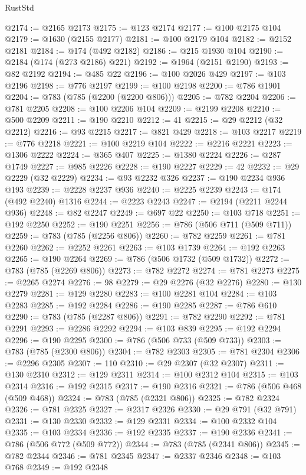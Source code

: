 \begin{lexlean}{RustStd}
\begin{coremodule}
{\begin{coremodule}
{{{{{{{{{{{{{{{{{{{{{{{{{{{{{{{{{{{{{{{{{{{{{{{{{{{{{{{@2174 := @2165 @2173
@2175 := @123 @2174
@2177 := @100 @2175 @104
@2179 := @1630 (@2155 @2177)
@2181 := @100 @2179 @104
@2182 := @2152 @2181
@2184 := @174 (@492 @2182)
@2186 := @215 @1930 @104
@2190 := @2184 (@174 (@273 @2186) @221)
@2192 := @1964 (@2151 @2190)
@2193 := @82 @2192
@2194 := @485 @22
@2196 := @100 @2026 @429
@2197 := @103 @2196
@2198 := @776 @2197
@2199 := @100 @2198
@2200 := @786 @1901
@2204 := @783 (@785 (@2200 (@2200 @806)))
@2205 := @782 @2204
@2206 := @781 @2205
@2208 := @100 @2206 @104
@2209 := @2199 @2208
@2210 := @500 @2209
@2211 := @190 @2210
@2212 := 41
@2215 := @29 @2212 (@32 @2212)
@2216 := @93 @2215
@2217 := @821 @429
@2218 := @103 @2217
@2219 := @776 @2218
@2221 := @100 @2219 @104
@2222 := @2216 @2221
@2223 := @1306 @2222
@2224 := @365 @407
@2225 := @1380 @2224
@2226 := @287 @1749
@2227 := @985 @2226
@2228 := @190 @2227
@2229 := 42
@2232 := @29 @2229 (@32 @2229)
@2234 := @93 @2232 @326
@2237 := @190 @2234 @936 @193
@2239 := @2228 @2237 @936
@2240 := @2225 @2239
@2243 := @174 (@492 @2240) @1316
@2244 := @2223 @2243
@2247 := @2194 (@2211 @2244 @936)
@2248 := @82 @2247
@2249 := @697 @22
@2250 := @103 @718
@2251 := @192 @2250
@2252 := @190 @2251
@2256 := @786 (@506 @711 (@509 @711))
@2259 := @783 (@785 (@2256 @806))
@2260 := @782 @2259
@2261 := @781 @2260
@2262 := @2252 @2261
@2263 := @103 @1739
@2264 := @192 @2263
@2265 := @190 @2264
@2269 := @786 (@506 @1732 (@509 @1732))
@2272 := @783 (@785 (@2269 @806))
@2273 := @782 @2272
@2274 := @781 @2273
@2275 := @2265 @2274
@2276 := 98
@2279 := @29 @2276 (@32 @2276)
@2280 := @130 @2279
@2281 := @129 @2280
@2283 := @100 @2281 @104
@2284 := @103 @2283
@2285 := @192 @2284
@2286 := @190 @2285
@2287 := @786 @610
@2290 := @783 (@785 (@2287 @806))
@2291 := @782 @2290
@2292 := @781 @2291
@2293 := @2286 @2292
@2294 := @103 @839
@2295 := @192 @2294
@2296 := @190 @2295
@2300 := @786 (@506 @733 (@509 @733))
@2303 := @783 (@785 (@2300 @806))
@2304 := @782 @2303
@2305 := @781 @2304
@2306 := @2296 @2305
@2307 := 110
@2310 := @29 @2307 (@32 @2307)
@2311 := @130 @2310
@2312 := @129 @2311
@2314 := @100 @2312 @104
@2315 := @103 @2314
@2316 := @192 @2315
@2317 := @190 @2316
@2321 := @786 (@506 @468 (@509 @468))
@2324 := @783 (@785 (@2321 @806))
@2325 := @782 @2324
@2326 := @781 @2325
@2327 := @2317 @2326
@2330 := @29 @791 (@32 @791)
@2331 := @130 @2330
@2332 := @129 @2331
@2334 := @100 @2332 @104
@2335 := @103 @2334
@2336 := @192 @2335
@2337 := @190 @2336
@2341 := @786 (@506 @772 (@509 @772))
@2344 := @783 (@785 (@2341 @806))
@2345 := @782 @2344
@2346 := @781 @2345
@2347 := @2337 @2346
@2348 := @103 @768
@2349 := @192 @2348
}}}}}}}}}}}}}}}}}}}}}}}}}}}}}}}}}}}}}}}}}}}}}}}}}}}}}}}
\end{coremodule}}
\end{coremodule}
\end{lexlean}

